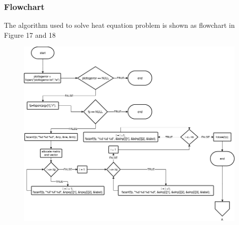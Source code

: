 \documentclass[a4paper,10pt]{article}
\begin{document}
\subsubsection{Flowchart}
The algorithm used to solve heat equation problem is shown as flowchart in Figure 17 and 18
\begin{figure}[h!]
	\centering
	\includegraphics[width=1.2\linewidth, angle=90,origin=c]{picture/heatEquationFlowchart}
	\caption{}
	\label{fig:heatequationflowchart}
\end{figure}
\newpage
\end{document}
